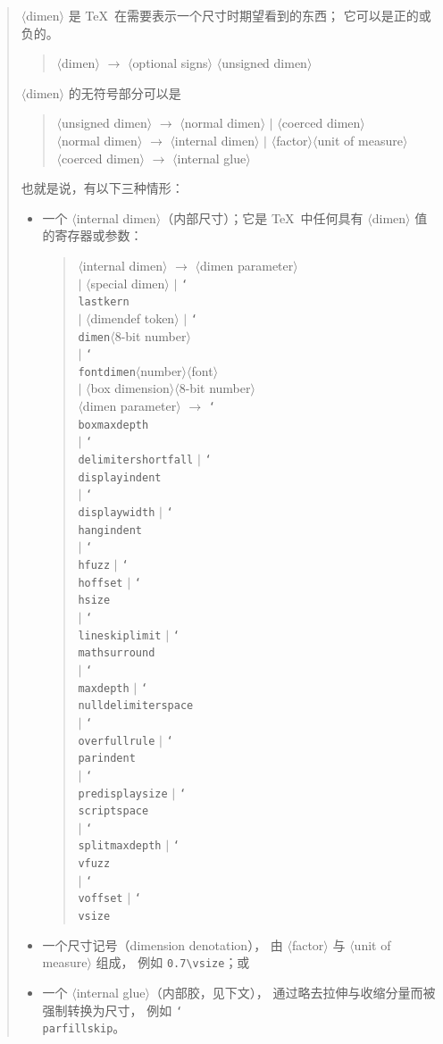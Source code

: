 \documentclass[a4paper]{rapport3}
\def\nl{\protect\\}\def\n#1{{\tt #1}}\def\cs#1{{\tt\char`\\#1}}\let\csc\cs
\def\gr#1{$\langle$#1$\rangle$}\def\key#1{{\tt#1}}
\newenvironment{disp}{\begin{quotation}}{\end{quotation}}
\begin{document}
\begin{disp}
\gr{dimen} 是 \TeX\ 在需要表示一个尺寸时期望看到的东西；
它可以是正的或负的。
\begin{disp}\gr{dimen} $\longrightarrow$ \gr{optional signs}%
     \gr{unsigned dimen}\end{disp}
\gr{dimen} 的无符号部分可以是
\begin{disp}\gr{unsigned dimen} $\longrightarrow$ \gr{normal dimen}
     $|$ \gr{coerced dimen}\nl
     \gr{normal dimen} $\longrightarrow$ \gr{internal dimen}
     $|$ \gr{factor}\gr{unit of measure}\nl
     \gr{coerced dimen} $\longrightarrow$ \gr{internal glue}
     \end{disp}
也就是说，有以下三种情形：
\begin{itemize} \item 一个 \gr{internal dimen}（内部尺寸）；它是
 \TeX\ 中任何具有 \gr{dimen} 值的寄存器或参数：
 \begin{disp}\PopIndentLevel\gr{internal dimen} $\longrightarrow$
      \gr{dimen parameter}\nl
      \indent $|$ \gr{special dimen} $|$ \cs{lastkern}\nl
      \indent $|$ \gr{dimendef token} $|$ \cs{dimen}\gr{8-bit number}\nl
      \indent $|$ \cs{fontdimen}\gr{number}\gr{font}\nl
      \indent $|$ \gr{box dimension}\gr{8-bit number}\nl
      \gr{dimen parameter} $\longrightarrow$ \cs{boxmaxdepth}\nl
      \indent $|$ \cs{delimitershortfall} $|$ \cs{displayindent}\nl
      \indent $|$ \cs{displaywidth} $|$ \cs{hangindent}\nl
      \indent $|$ \cs{hfuzz} $|$ \cs{hoffset} $|$ \cs{hsize}\nl
      \indent $|$ \cs{lineskiplimit} $|$ \cs{mathsurround}\nl
      \indent $|$ \cs{maxdepth} $|$ \cs{nulldelimiterspace}\nl
      \indent $|$ \cs{overfullrule} $|$ \cs{parindent}\nl
      \indent $|$ \cs{predisplaysize} $|$ \cs{scriptspace}\nl
      \indent $|$ \cs{splitmaxdepth} $|$ \cs{vfuzz}\nl
      \indent $|$ \cs{voffset} $|$ \cs{vsize}
 \end{disp}
\item  一个尺寸记号（dimension denotation），
 由 \gr{factor} 与 \gr{unit of measure} 组成，
 例如 \verb>0.7\vsize>；或
\item 一个 \gr{internal glue}（内部胶，见下文），
 通过略去拉伸与收缩分量而被强制转换为尺寸，
 例如 \cs{parfillskip}。
\end{itemize}


\end{disp}
\end{document}

